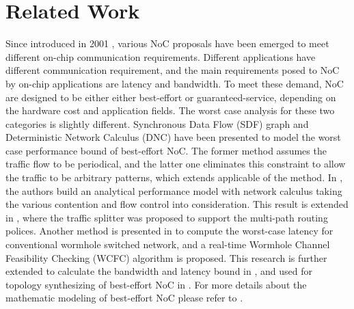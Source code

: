 \documentclass[10pt,journal]{IEEEtran}
\begin{document}
\section{Related Work}\label{related}
Since introduced in 2001 \cite{DaTo01}, various NoC proposals have been emerged to meet different on-chip communication requirements. Different applications have different communication requirement, and the main requirements posed to NoC by on-chip applications are latency and bandwidth. To meet these demand, NoC are designed to be either either best-effort or guaranteed-service, depending on the hardware cost and application fields. The worst case analysis for these two categories is slightly different. Synchronous Data Flow (SDF) graph \cite{poplavko2003task} and Deterministic Network Calculus \cite{qian2009analysis} (DNC) have been presented to model the worst case performance bound of best-effort NoC. The former method assumes the traffic flow to be periodical, and the latter one eliminates this constraint to allow the traffic to be arbitrary patterns, which extends applicable of the method. In \cite{qian2009analysis}, the authors build an analytical performance model with network calculus taking the various contention and flow control into consideration. This result is extended in \cite{Du:2012:WPA:2380445.2380469}, where the traffic splitter was proposed to support the multi-path routing polices. Another method is presented in \cite{Lee:2003:RWC:846077.846083} to compute the worst-case latency for conventional wormhole switched network, and a real-time Wormhole Channel Feasibility Checking (WCFC) algorithm is proposed. This research is further extended to calculate the bandwidth and latency bound in \cite{6109240}, and used for topology synthesizing of best-effort NoC in \cite{EPFL-ARTICLE-186879}. For more details about the mathematic modeling of best-effort NoC please refer to \cite{Kiasari:2013:MFP:2480741.2480755}.
\end{document}
